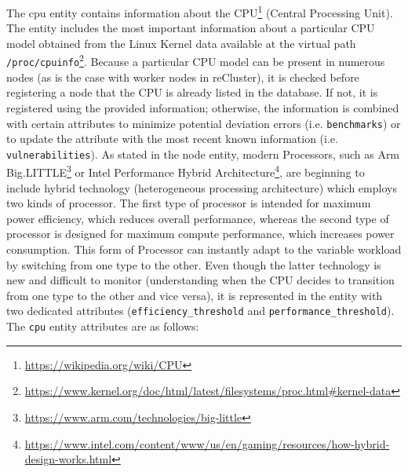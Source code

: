 The cpu entity contains information about the CPU\footnote{\url{https://wikipedia.org/wiki/CPU}}
(Central Processing Unit).
\newline
The entity includes the most important information about a particular CPU model obtained
from the Linux Kernel data available at the virtual path \texttt{/proc/cpuinfo}\footnote{\url{https://www.kernel.org/doc/html/latest/filesystems/proc.html\#kernel-data}}.
\newline
Because a particular CPU model can be present in numerous nodes (as is the case with
worker nodes in reCluster), it is checked before registering a node that the CPU
is already listed in the database. If not, it is registered using the provided information;
otherwise, the information is combined with certain attributes to minimize potential
deviation errors (i.e. \texttt{benchmarks}) or to update the attribute with the most
recent known information (i.e. \texttt{vulnerabilities}).
\newline
As stated in the node entity, modern Processors, such as Arm Big.LITTLE\footnote{\url{https://www.arm.com/technologies/big-little}}
or Intel Performance Hybrid Architecture\footnote{\url{https://www.intel.com/content/www/us/en/gaming/resources/how-hybrid-design-works.html}},
are beginning to include hybrid technology (heterogeneous processing
architecture) which employs two kinds of processor. The first type of processor
is intended for maximum power efficiency, which reduces overall performance,
whereas the second type of processor is designed for maximum compute performance,
which increases power consumption. This form of Processor can instantly adapt to
the variable workload by switching from one type to the other\cite{cpu_arm}\cite{cpu_intel}.
Even though the latter technology is new and difficult to monitor (understanding
when the CPU decides to transition from one type to the other and vice versa),
it is represented in the entity with two dedicated attributes (\texttt{efficiency\_threshold}
and \texttt{performance\_threshold}).
\newline
The \texttt{cpu} entity attributes are as follows:

